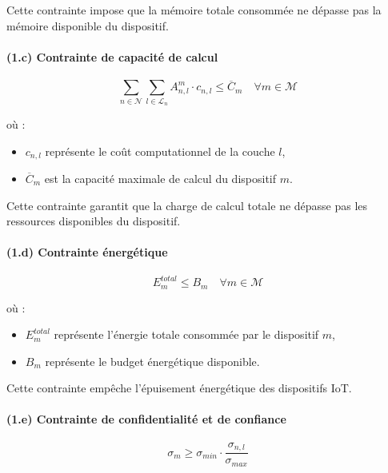 \documentclass[12pt,a4paper]{report}
\begin{document}
Cette contrainte impose que la mémoire totale consommée ne dépasse pas la mémoire disponible du dispositif.

\paragraph{(1.c) Contrainte de capacité de calcul}

\begin{equation}
\sum_{n \in \mathcal{N}} \sum_{l \in \mathcal{L}_n} A_{n,l}^m \cdot c_{n,l}
\leq \overline{C}_m
\quad \forall m \in \mathcal{M}
\end{equation}

où :
\begin{itemize}
    \item $c_{n,l}$ représente le coût computationnel de la couche $l$,
    \item $\overline{C}_m$ est la capacité maximale de calcul du dispositif $m$.
\end{itemize}

Cette contrainte garantit que la charge de calcul totale ne dépasse pas les ressources disponibles du dispositif.

\paragraph{(1.d) Contrainte énergétique}

\begin{equation}
E_m^{total} \leq B_m
\quad \forall m \in \mathcal{M}
\end{equation}

où :
\begin{itemize}
    \item $E_m^{total}$ représente l’énergie totale consommée par le dispositif $m$,
    \item $B_m$ représente le budget énergétique disponible.
\end{itemize}

Cette contrainte empêche l’épuisement énergétique des dispositifs IoT.

\paragraph{(1.e) Contrainte de confidentialité et de confiance}

\begin{equation}
\sigma_m \geq \sigma_{min} \cdot \frac{\sigma_{n,l}}{\sigma_{max}}
\end{equation}
\end{document}
